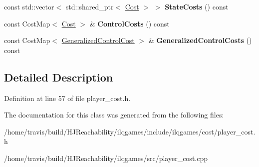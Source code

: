 \begin{DoxyCompactItemize}
\item 
const std\+::vector$<$ std\+::shared\+\_\+ptr$<$ \hyperlink{classilqgames_1_1_cost}{Cost} $>$ $>$ {\bfseries State\+Costs} () const \hypertarget{classilqgames_1_1_player_cost_aeaead26e5c4d0a845a8eed317cd12464}{}\label{classilqgames_1_1_player_cost_aeaead26e5c4d0a845a8eed317cd12464}

\item 
const Cost\+Map$<$ \hyperlink{classilqgames_1_1_cost}{Cost} $>$ \& {\bfseries Control\+Costs} () const \hypertarget{classilqgames_1_1_player_cost_a4fa0717c227acf2773deda56eaf62e99}{}\label{classilqgames_1_1_player_cost_a4fa0717c227acf2773deda56eaf62e99}

\item 
const Cost\+Map$<$ \hyperlink{classilqgames_1_1_generalized_control_cost}{Generalized\+Control\+Cost} $>$ \& {\bfseries Generalized\+Control\+Costs} () const \hypertarget{classilqgames_1_1_player_cost_a62ec3d489a4a89af14b9a17424981fa0}{}\label{classilqgames_1_1_player_cost_a62ec3d489a4a89af14b9a17424981fa0}

\end{DoxyCompactItemize}


\subsection{Detailed Description}


Definition at line 57 of file player\+\_\+cost.\+h.



The documentation for this class was generated from the following files\+:\begin{DoxyCompactItemize}
\item 
/home/travis/build/\+H\+J\+Reachability/ilqgames/include/ilqgames/cost/player\+\_\+cost.\+h\item 
/home/travis/build/\+H\+J\+Reachability/ilqgames/src/player\+\_\+cost.\+cpp\end{DoxyCompactItemize}
